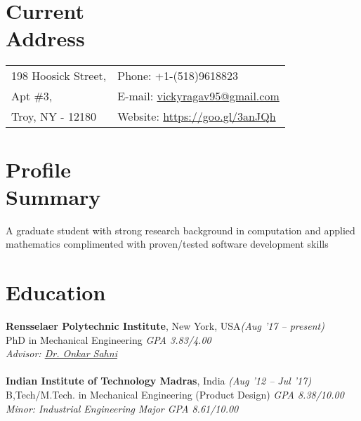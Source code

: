 \documentclass[margin,line]{res}
\begin{document}

\begin{resume}
\section{\sc Current\\ Address}
\begin{tabular}{@{}p{3.8in}p{3in}}
198 Hoosick Street,            & {Phone:} +1-(518)9618823 \\
Apt \#3, & {E-mail:} \href{mailto:vickyragav95@gmail.com}{\color {RoyalPurple} vickyragav95@gmail.com}\\
Troy, NY - 12180 & {Website: }{\href {https://goo.gl/3anJQh} {\color {RoyalPurple} https://goo.gl/3anJQh}}\\
\end{tabular}

\section{\sc Profile \\Summary}
	A graduate student with strong research background in
	computation and applied mathematics complimented
	with proven/tested software development skills 
\section{\sc Education}
{\bf Rensselaer Polytechnic Institute}, New York, USA\hfill {\em (Aug '17 -- present)}\\
PhD in Mechanical Engineering \hfill{\em GPA 3.83/4.00}\\
{\em Advisor: \href {http://homepages.rpi.edu/~sahni/} {\color{RoyalPurple} Dr. Onkar Sahni}}\\\\
{\bf Indian Institute of Technology Madras}, India \hfill {\em (Aug '12 -- Jul '17)}\\
B,Tech/M.Tech. in Mechanical Engineering (Product Design) \hfill{\em GPA 8.38/10.00}\\
{\em Minor: Industrial Engineering} \hfill {\em Major GPA 8.61/10.00}



\end{resume}
\end{document}
